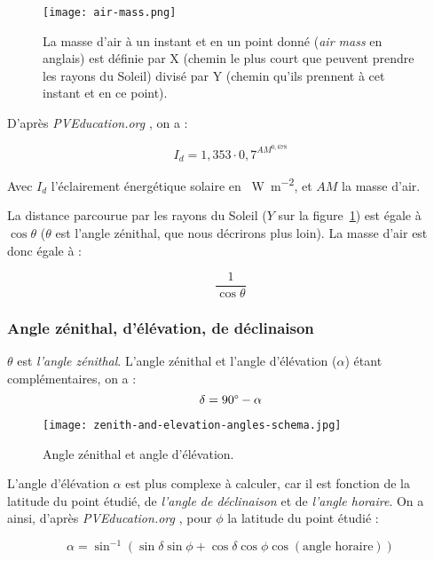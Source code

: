 \documentclass[12pt]{article}
\begin{document}
\begin{figure}[H]
	\centerline{\texttt{[image: air-mass.png]}}
	\caption{La masse d'air à un instant et en un point donné (\textit{air mass} en anglais) est définie par X (chemin le plus court que peuvent prendre les rayons du Soleil) divisé par Y (chemin qu'ils prennent à cet instant et en ce point).} %
	\label{fig:air-mass}
\end{figure}



D'après \emph{PVEducation.org} \cite{pos_air_mass}, on a :

\[
	I_d = 1,353 \cdot 0,7^{{AM}^{0,678}}
\]

Avec $I_d$ l'éclairement énergétique solaire en \SI{}{\watt\per\square\meter}, et $AM$ la masse d'air.

La distance parcourue par les rayons du Soleil ($Y$ sur la figure~\ref{fig:air-mass}) est égale à $\cos \theta$ ($\theta$ est l'angle zénithal, que nous décrirons plus loin).
La masse d'air est donc égale à :

\[\frac{1 }{\cos \theta}\]

\subsubsection{Angle zénithal, d'élévation, de déclinaison}
$\theta$ est \emph{l'angle zénithal}. L'angle zénithal et l'angle d'élévation ($\alpha$) étant complémentaires, on a :
\[
	\delta = 90\degree - \alpha
\]


 \begin{figure}[H]
	\centerline{\texttt{[image: zenith-and-elevation-angles-schema.jpg]}}
	\caption{Angle zénithal et angle d'élévation.}
	\label{fig:elevation-and-zenith-angle}
\end{figure}

L'angle d'élévation $\alpha$ est plus complexe à calculer, car il est fonction de la latitude du point étudié, de \emph{l'angle de déclinaison} et de \emph{l'angle horaire}. On a ainsi, d'après \emph{PVEducation.org} \cite{pos_elevation_angle}, pour $\phi$ la latitude du point étudié :

\[
	\alpha = \sin^{-1} \left(
		\sin \delta \sin \phi +
		\cos \delta \cos \phi \cos \left( \text{angle horaire} \right)
	\right)
\]
\end{document}
